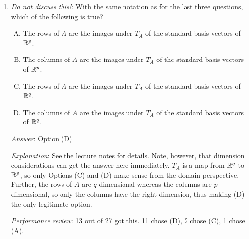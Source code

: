 \documentclass[10pt]{amsart}
\begin{document}
\begin{enumerate}
  \begin{enumerate}[(A)]
  \item If $p < q$, $T_A$ must be surjective
  \item If $p > q$, $T_A$ must be surjective
  \item If $p = q$, $T_A$ must be surjective
  \item If $p < q$, $T_A$ cannot be surjective
  \item If $p > q$, $T_A$ cannot be surjective
  \end{enumerate}

  {\em Answer}: Option (E)

  {\em Explanation}: For the linear transformation $T_A$ to be
  surjective, the matrix $A$ needs to have full row rank $p$, because
  we want the system to always be consistent and therefore we want
  that there should be no zero rows in the rref. We also know that the
  rank of the matrix is at most equal to the minimum of the number of
  rows and number of columns. Therefore, if $p > q$, $A$ cannot have
  full row rank and $T_A$ cannot be surjective.

  {\em Performance review}: 19 out of 27 got this. 5 chose (D), 2
  chose (C).
\item {\em Do not discuss this!}: With the same notation as for the
  last three questions, which of the following is true?

  \begin{enumerate}[(A)]
  \item The rows of $A$ are the images under $T_A$ of the standard
    basis vectors of $\mathbb{R}^p$.
  \item The columns of $A$ are the images under $T_A$ of the standard
    basis vectors of $\mathbb{R}^p$.
  \item The rows of $A$ are the images under $T_A$ of the standard
    basis vectors of $\mathbb{R}^q$.
  \item The columns of $A$ are the images under $T_A$ of the standard
    basis vectors of $\mathbb{R}^q$.
  \end{enumerate}

  {\em Answer}: Option (D)

  {\em Explanation}: See the lecture notes for details. Note, however,
  that dimension considerations can get the answer here
  immediately. $T_A$ is a map from $\mathbb{R}^q$ to $\mathbb{R}^p$, so only Options
  (C) and (D) make sense from the domain perspective. Further, the
  rows of $A$ are $q$-dimensional whereas the columns are
  $p$-dimensional, so only the columns have the right dimension, thus
  making (D) the only legitimate option.

  {\em Performance review}: 13 out of 27 got this. 11 chose (D), 2
  chose (C), 1 chose (A).
\end{enumerate}
\end{document}
